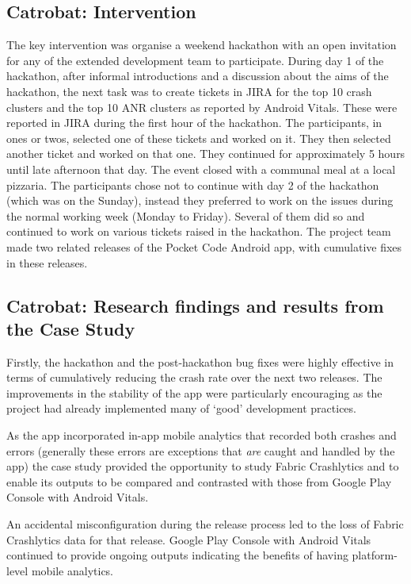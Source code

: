 \subsection{Catrobat: Intervention}
The key intervention was organise a weekend hackathon with an open invitation for any of the extended development team to participate. During day 1 of the hackathon, after informal introductions and a discussion about the aims of the hackathon, the next task was to create tickets in JIRA for the top 10 crash clusters and the top 10 ANR clusters as reported by Android Vitals. These were reported in JIRA during the first hour of the hackathon. The participants, in ones or twos, selected one of these tickets and worked on it. They then selected another ticket and worked on that one. They continued for approximately 5 hours until late afternoon that day. The event closed with a communal meal at a local pizzaria. The participants chose not to continue with day 2 of the hackathon (which was on the Sunday), instead they preferred to work on the issues during the normal working week (Monday to Friday). Several of them did so and continued to work on various tickets raised in the hackathon. The project team made two related releases of the Pocket Code Android app, with cumulative fixes in these releases.

\subsection{Catrobat: Research findings and results from the Case Study}
Firstly, the hackathon and the post-hackathon bug fixes were highly effective in terms of cumulatively reducing the crash rate over the next two releases. The improvements in the stability of the app were particularly encouraging as the project had already implemented many of `good' development practices.

As the app incorporated in-app mobile analytics that recorded both crashes and errors (generally these errors are exceptions that \textit{are} caught and handled by the app) the case study provided the opportunity to study Fabric Crashlytics and to enable its outputs to be compared and contrasted with those from Google Play Console with Android Vitals.

An accidental misconfiguration during the release process led to the loss of Fabric Crashlytics data for that release. Google Play Console with Android Vitals continued to provide ongoing outputs indicating the benefits of having platform-level mobile analytics.

